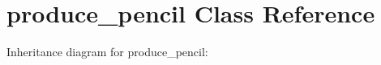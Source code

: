 \hypertarget{classproduce__pencil}{}\section{produce\+\_\+pencil Class Reference}
\label{classproduce__pencil}


Inheritance diagram for produce\+\_\+pencil\+:
